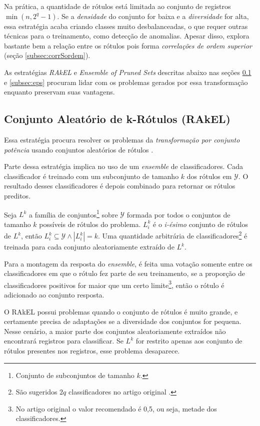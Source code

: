 \documentclass[runningheads,a4paper]{llncs}
\begin{document}
Na prática, a quantidade de rótulos está limitada ao conjunto de registros $\min(n, 2^q-1)$. Se a \textit{densidade} do conjunto for baixa e a \textit{diversidade} for alta, essa estratégia acaba criando classes muito desbalanceadas, o que requer outras técnicas para o treinamento, como detecção de anomalias. Apesar disso, explora bastante bem a relação entre os rótulos \cite{Read2008-bt} pois forma \textit{correlações de ordem superior} (seção \ref{subsec:corrSordem}).

As estratégias \textit{RAkEL} \cite{Tsoumakas2007-wm} e \textit{Ensemble of Pruned Sets} \cite{Read2008-bt} descritas abaixo nas seções \ref{subsec:rakel} e \ref{subsec:eps} procuram lidar com os problemas gerados por essa transformação enquanto preservam suas vantagens.

\subsection{Conjunto Aleatório de k-Rótulos (RAkEL)} \label{subsec:rakel}

Essa estratégia procura resolver os problemas da \textit{transformação por conjunto potência} usando conjuntos aleatórios de rótulos \cite{Tsoumakas2007-wm}.

Parte dessa estratégia implica no uso de um \textit{ensemble} de classificadores. Cada classificador é treinado com um subconjunto de tamanho $k$ dos rótulos em $\mathcal{Y}$. O resultado desses classificadores é depois combinado para retornar os rótulos preditos.

Seja $L^k$ a família de conjuntos\footnote{Conjunto de subconjuntos de tamanho $k$.} sobre $\mathcal{Y}$ formada por todos o conjuntos de tamanho $k$ possíveis de rótulos do problema. $L^k_i$ é o \textit{i-ésimo} conjunto de rótulos de $L^k$, então  $L^k_i \subseteq \mathcal{Y} \wedge |L^k_i| = k$. Uma quantidade arbitrária de classificadores\footnote{São sugeridos $2q$ classificadores no artigo original \cite{Tsoumakas2007-wm}.} é treinada para cada conjunto aleatoriamente extraído de $L^k$.

Para a montagem da resposta do \textit{ensemble}, é feita uma votação somente entre os classificadores em que o rótulo fez parte de seu treinamento, se a proporção de classificadores positivos for maior que um certo limite\footnote{No artigo original o valor recomendado é 0,5, ou seja, metade dos classificadores.}, então o rótulo é adicionado ao conjunto resposta.

O RAkEL possui problemas quando o conjunto de rótulos é muito grande, e certamente precisa de adaptações se a diversidade dos conjuntos for pequena. Nesse cenário, a maior parte dos conjuntos aleatoriamente extraídos não encontrará registros para classificar. Se $L^k$ for restrito apenas aos conjunto de rótulos presentes nos registros, esse problema desaparece.
 
\end{document}
